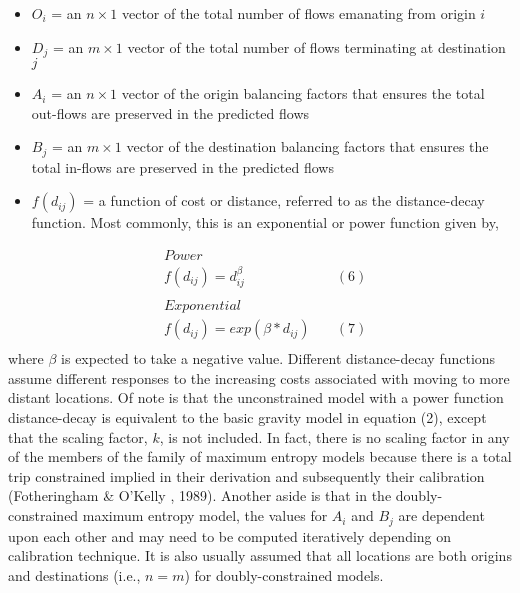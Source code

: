 \documentclass[11pt]{article}
\begin{document}
\begin{itemize}
\item
  \(O_{i}\) = an \(n \times 1\) vector of the total number of flows
  emanating from origin \(i\)
\item
  \(D_{j}\) = an \(m \times 1\) vector of the total number of flows
  terminating at destination \(j\)
\item
  \(A_{i}\) = an \(n \times 1\) vector of the origin balancing factors
  that ensures the total out-flows are preserved in the predicted flows
\item
  \(B_{j}\) = an \(m \times 1\) vector of the destination balancing
  factors that ensures the total in-flows are preserved in the predicted
  flows
\item
  \(f(d_{ij})\) = a function of cost or distance, referred to as the
  distance-decay function. Most commonly, this is an exponential or power
  function given by,
\end{itemize}
%
\[
\begin{align}
&Power\\
&f(d_{ij}) = d_{ij}^\beta \quad & (6) \\
\\
&Exponential \\
&f(d_{ij}) = exp(\beta*d_{ij}) \quad & (7) \\
\end{align}
\]
%
where \(\beta\) is expected to take a negative value. Different
distance-decay functions assume different responses to the increasing
costs associated with moving to more distant locations. Of note is that
the unconstrained model with a power function distance-decay is
equivalent to the basic gravity model in equation (2), except that the
scaling factor, \(k\), is not included. In fact, there is no scaling
factor in any of the members of the family of maximum entropy models
because there is a total trip constrained implied in their derivation
and subsequently their calibration (Fotheringham \& O'Kelly , 1989).
Another aside is that in the doubly-constrained maximum entropy model,
the values for \(A_{i}\) and \(B_{j}\) are dependent upon each other and
may need to be computed iteratively depending on calibration technique.
It is also usually assumed that all locations are both origins and
destinations (i.e., \(n=m\)) for doubly-constrained models.
\end{document}
